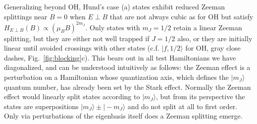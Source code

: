 \documentclass[%
 reprint,
 amsmath,amssymb,
 aps,
prl,
]{revtex4-1}
\newcommand{\epb}{{$E\!\perp\!B$}}
\newcommand{\epbm}{{E\!\perp\!B}}
\begin{document}


Generalizing beyond OH, Hund's case (a) states exhibit reduced Zeeman splittings near $B\!=\!0$ when \epb{} that are not always cubic as for OH but satisfy $H_\epbm(B)\propto (\mu_BB)^{2m_J}$. Only states with $m_J=1/2$ retain a linear Zeeman splitting, but they are either not well trapped if $J=1/2$ also, or they are initially linear until avoided crossings with other states (c.f. $|f,1/2\rangle$ for OH, gray close dashes, Fig.~\ref{fig:blocking}c). This bears out in all test Hamiltonians we have diagonalized, and can be understood intuitively as follows: the Zeeman effect is a perturbation on a Hamiltonian whose quantization axis, which defines the $|m_J\rangle$ quantum number, has already been set by the Stark effect. Normally the Zeeman effect would linearly split states according to $|m_J\rangle$, but from its perspective the states are superpositions $|m_J\rangle\pm|\!-\!m_J\rangle$ and do not split at all to first order. Only via perturbations of the eigenbasis itself does a Zeeman splitting emerge.



%
\end{document}
